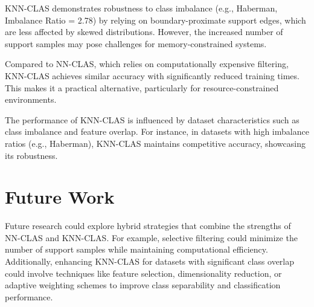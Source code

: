 \documentclass[conference]{IEEEtran}
\begin{document}
KNN-CLAS demonstrates robustness to class imbalance (e.g., Haberman, Imbalance Ratio = 2.78) by relying on boundary-proximate support edges, which are less affected by skewed distributions. However, the increased number of support samples may pose challenges for memory-constrained systems.

Compared to NN-CLAS, which relies on computationally expensive filtering, KNN-CLAS achieves similar accuracy with significantly reduced training times. This makes it a practical alternative, particularly for resource-constrained environments.

The performance of KNN-CLAS is influenced by dataset characteristics such as class imbalance and feature overlap. For instance, in datasets with high imbalance ratios (e.g., Haberman), KNN-CLAS maintains competitive accuracy, showcasing its robustness.

\section{Future Work}
Future research could explore hybrid strategies that combine the strengths of NN-CLAS and KNN-CLAS. For example, selective filtering could minimize the number of support samples while maintaining computational efficiency. Additionally, enhancing KNN-CLAS for datasets with significant class overlap could involve techniques like feature selection, dimensionality reduction, or adaptive weighting schemes to improve class separability and classification performance.
\end{document}
